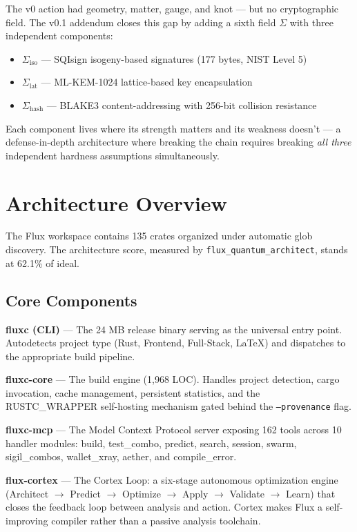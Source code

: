 \documentclass[11pt,a4paper]{article}
\begin{document}
The v0 action had geometry, matter, gauge, and knot — but no cryptographic field. The v0.1 addendum closes this gap by adding a sixth field $\Sigma$ with three independent components:
\begin{itemize}
\item $\Sigma_{\mathrm{iso}}$ — SQIsign isogeny-based signatures (177 bytes, NIST Level 5)
\item $\Sigma_{\mathrm{lat}}$ — ML-KEM-1024 lattice-based key encapsulation
\item $\Sigma_{\mathrm{hash}}$ — BLAKE3 content-addressing with 256-bit collision resistance
\end{itemize}
Each component lives where its strength matters and its weakness doesn't — a defense-in-depth architecture where breaking the chain requires breaking \textit{all three} independent hardness assumptions simultaneously.

\section{Architecture Overview}

The Flux workspace contains 135 crates organized under automatic glob discovery. The architecture score, measured by \texttt{flux\_quantum\_architect}, stands at 62.1\% of ideal.

\subsection{Core Components}

\textbf{fluxc (CLI)} — The 24 MB release binary serving as the universal entry point. Autodetects project type (Rust, Frontend, Full-Stack, LaTeX) and dispatches to the appropriate build pipeline.

\textbf{fluxc-core} — The build engine (1,968 LOC). Handles project detection, cargo invocation, cache management, persistent statistics, and the RUSTC\_WRAPPER self-hosting mechanism gated behind the \texttt{--provenance} flag.

\textbf{fluxc-mcp} — The Model Context Protocol server exposing 162 tools across 10 handler modules: build, test\_combo, predict, search, session, swarm, sigil\_combos, wallet\_xray, aether, and compile\_error.

\textbf{flux-cortex} — The Cortex Loop\texttrademark: a six-stage autonomous optimization engine (Architect $\rightarrow$ Predict $\rightarrow$ Optimize $\rightarrow$ Apply $\rightarrow$ Validate $\rightarrow$ Learn) that closes the feedback loop between analysis and action. Cortex makes Flux a self-improving compiler rather than a passive analysis toolchain.
\end{document}
